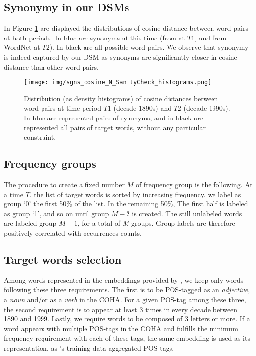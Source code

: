 \documentclass[11pt]{article}
\newcommand{\firstTime}{T1}
\newcommand{\secondTime}{T2}
\begin{document}
\subsection{Synonymy in our DSMs}
\label{appendix:checkSyn}

In Figure \ref{fig:sanityCheckSynonymy} are displayed the distributions of cosine distance between word pairs at both periods. In blue are synonyms at this time (from \citet{fernald1896english} at $\firstTime$, and from WordNet at $\secondTime$). In black are all possible word pairs. We observe that synonymy is indeed captured by our DSM as synonyms are significantly closer in cosine distance than other word pairs.

\begin{figure}[ht]
    \centering
    \texttt{[image: img/sgns\_cosine\_N\_SanityCheck\_histograms.png]}
    \caption{Distribution (as density histograms) of cosine distances between word pairs at time period $T1$ (decade 1890s) and $T2$ (decade 1990s). In blue are represented pairs of synonyms, and in black are represented all pairs of target words, without any particular constraint.}
    \label{fig:sanityCheckSynonymy}
\end{figure}


\subsection{Frequency groups}
\label{freqGroups}
The procedure to create a fixed number $M$ of frequency group is the following. At a time $T$, the list of target words is sorted by increasing frequency, we label as group `0' the first 50\% of the list. In the remaining 50\%, The first half is labeled as group `1', and so on until group $M-2$ is created. The still unlabeled words are labeled group $M-1$, for a total of $M$ groups. Group labels are therefore positively correlated with occurrences counts. 

\subsection{Target words selection}
\label{appendix:targets}
Among words represented in the embeddings provided by \citet{hamilton-etal-2016-diachronic}, we keep only words following these three requirements. The first is to be POS-tagged as an \textit{adjective}, a \textit{noun} and/or as a \textit{verb} in the COHA. For a given POS-tag among these three, the second requirement is to appear at least 3 times in every decade between 1890 and 1999. Lastly, we require words to be composed of 3 letters or more. If a word appears with multiple POS-tags in the COHA and fulfills the minimum frequency requirement with each of these tags, the same embedding is used as its representation, as \citet{hamilton-etal-2016-diachronic}'s training data aggregated POS-tags.
\end{document}
